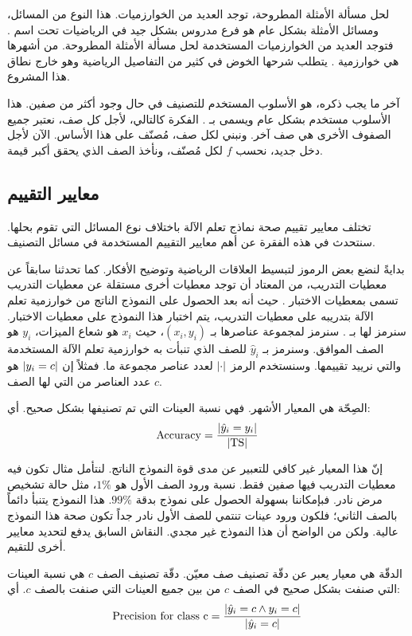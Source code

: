 لحل مسألة الأمثلة المطروحة، توجد العديد من الخوارزميات. هذا النوع من المسائل، ومسائل الأمثلة بشكل عام هو فرع
مدروس بشكل جيد في الرياضيات تحت اسم .
فتوجد العديد من الخوارزميات المستخدمة لحل مسألة الأمثلة المطروحة.
من أشهرها هي خوارزمية
%
. يتطلب شرحها الخوض في كثير من التفاصيل الرياضية وهو خارج نطاق هذا المشروع.

آخر ما يجب ذكره، هو الأسلوب المستخدم للتصنيف في حال وجود أكثر من صفين.
هذا الأسلوب مستخدم بشكل عام ويسمى بـ
%
. الفكرة كالتالي، لأجل كل صف، نعتبر جميع الصفوف الأخرى هي صف آخر.
ونبني لكل صف، مُصنّف على هذا الأساس.
الآن لأجل دخل جديد، نحسب $f$ لكل مُصنّف، ونأخذ الصف الذي يحقق أكبر قيمة.



\subsection{معايير التقييم}
تختلف معايير تقييم صحة نماذج تعلم الآلة باختلاف نوع المسائل التي تقوم بحلها.
سنتحدث في هذه الفقرة عن أهم معايير التقييم المستخدمة في مسائل التصنيف.

بدايةً لنضع بعض الرموز لتبسيط العلاقات الرياضية وتوضيح الأفكار.
كما تحدثنا سابقاً عن معطيات التدريب،
من المعتاد أن توجد معطيات أخرى مستقلة عن معطيات التدريب تسمى بمعطيات الاختبار .
حيث أنه بعد الحصول على النموذج الناتج من خوارزمية تعلم الآلة بتدريبه على معطيات التدريب،
يتم اختبار هذا النموذج على معطيات الاختبار.
سنرمز لها بـ .
سنرمز لمجموعة عناصرها بـ $ (x_i, y_i) $، حيث $x_i$ هو شعاع الميزات، $y_i$ هو الصف الموافق.
وسنرمز بـ $\hat{y}_i$ للصف الذي تنبأت به خوارزمية تعلم الآلة المستخدمة والتي نرييد تقييمها.
وسنستخدم الرمز $ \left\vert\cdot\right\vert $ لعدد عناصر مجموعة ما.
فمثلاً إن $ \left\vert y_i = c\right\vert $ هو عدد العناصر من  التي لها الصف $c$.

الصِحّة  هي المعيار الأشهر. فهي نسبة العينات التي تم تصنيفها بشكل صحيح. أي:
$$ \mathrm{Accuracy} = \frac{ \left\vert\hat{y}_i = y_i\right\vert }{ \left\vert \mathrm{TS} \right\vert } $$

إنّ هذا المعيار غير كافي للتعبير عن مدى قوة النموذج الناتج.
لنتأمل مثال تكون فيه معطيات التدريب فيها صفين فقط.
نسبة ورود الصف الأول هو $1\%$،
مثل حالة تشخيص مرض نادر.
فبإمكاننا بسهولة الحصول على نموذج بدقة $99\%$.
هذا النموذج يتنبأ دائماً بالصف الثاني؛
فلكون ورود عينات تنتمي للصف الأول نادر جداً تكون صحة هذا النموذج عالية.
ولكن من الواضح أن هذا النموذج غير مجدي.
النقاش السابق يدفع لتحديد معايير أخرى للتقيم.

الدقّة  هي معيار يعبر عن دقّة تصنيف صف معيّن.
دقّة تصنيف الصف $c$ هي نسبة العينات التي صنفت بشكل صحيح في الصف $c$ من بين جميع العينات التي صنفت بالصف $c$.
أي:
$$ \mathrm{Precision\ for\ class\ c} = \frac{ \left\vert \hat{y}_i = c \wedge y_i = c \right\vert }
{ \left\vert \hat{y}_i = c \right\vert } $$

